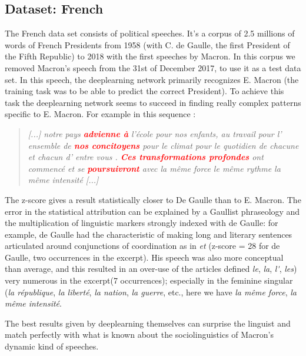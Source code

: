 \subsection{Dataset: French}

The French data set consists of political speeches. It's a corpus of 2.5 millions of words of French Presidents from 1958 (with C. de Gaulle, the first President of the Fifth Republic) to 2018 with the first speeches by Macron. In this corpus we removed Macron's speech from the 31st of December 2017, to use it as a test data set. In this speech, the deeplearning network primarily recognizes E. Macron (the training task was to be able to predict the correct President). To achieve this task the deeplearning network seems to succeed in finding really complex patterns specific to E. Macron. For example in this sequence :

\begin{quote}
\textit{[...] notre pays \textcolor{red}{\textbf{advienne à}} l'école pour nos enfants, au travail pour l' ensemble de \textcolor{red}{\textbf{nos concitoyens}} pour le climat pour le quotidien de chacune et chacun d' entre vous . \textcolor{red}{\textbf{Ces transformations profondes}} ont commencé et se \textcolor{red}{\textbf{poursuivront}} avec la même force le même rythme la même intensité [...]} 
\end{quote}

The z-score gives a result statistically closer to De Gaulle than to E. Macron. The error in the statistical attribution can be explained by a Gaullist phraseology and the multiplication of linguistic markers strongly indexed with de Gaulle: for example, de Gaulle had the characteristic of making long and literary sentences articulated around conjunctions of coordination as in \textit{et} (z-score = 28 for de Gaulle, two occurrences in the excerpt). His speech was also more conceptual than average, and this resulted in an over-use of the articles defined \textit{le}, \textit{la}, \textit{l\'}, \textit{les}) very numerous in the excerpt(7 occurrences); especially in the feminine singular (\textit{la république}, \textit{la liberté}, \textit{la nation}, \textit{la guerre}, etc., here we have \textit{la même force}, \textit{la même intensité}.

The best results given by deeplearning themselves can surprise the linguist and match perfectly with what is known about the sociolinguistics of Macron's dynamic kind of speeches.

